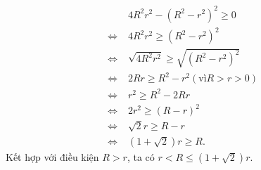 \begin{bt}
{\begin{align*}
	&4R^2r^2-(R^2-r^2)^2 \geq 0\\
	\Leftrightarrow\; &4R^2r^2 \geq (R^2-r^2)^2\\
	\Leftrightarrow\; &\sqrt{4R^2r^2} \geq \sqrt{(R^2-r^2)^2}\\
	\Leftrightarrow\; &2Rr \geq R^2-r^2 (\text{vì} R>r>0)\\
	\Leftrightarrow\; &r^2 \geq R^2-2Rr\\
	\Leftrightarrow\; &2r^2 \geq (R-r)^2\\
	\Leftrightarrow\; &\sqrt{2}r \geq R-r\\
	\Leftrightarrow\; &(1+\sqrt{2})r \geq R.
	\end{align*}
	Kết hợp với điều kiện $R>r$, ta có $r<R \leq (1+\sqrt{2})r.$
	}
\end{bt}